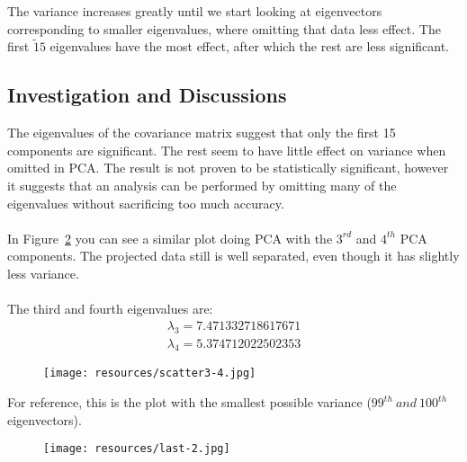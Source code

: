 \documentclass{article}
\begin{document}
\begin{multicols}{2}
    The variance increases greatly until we start looking at eigenvectors corresponding to
    smaller eigenvalues, where omitting that data less effect. The first $\tilde15$ eigenvalues
    have the most effect, after which the rest are less significant.

    \subsection{Investigation and Discussions}
    The eigenvalues of the covariance matrix suggest that only the first 15 components are significant.
    The rest seem to have little effect on variance when omitted in PCA. The result is not proven
    to be statistically significant, however it suggests that an analysis can be performed by omitting
    many of the eigenvalues without sacrificing too much accuracy.
    \\
    \\ 
    In Figure~\ref{fig:add} you can see a similar plot doing PCA with the $3^{rd}$ and $4^{th}$ PCA components.
    The projected data still is well separated, even though it has slightly less variance. 
    \\
    \\
    The third and fourth eigenvalues are:
    \begin{align*}
        \lambda_3 = 7.471332718617671 \\
        \lambda_4 = 5.374712022502353
    \end{align*}
    
    \begin{figure}[H]
        \texttt{[image: resources/scatter3-4.jpg]}
        \label{fig:add} 
    \end{figure}
    
    For reference, this is the plot with the smallest possible variance ($99^{th}\ and\ 100^{th}$ eigenvectors).
    
    \begin{figure}[H]
        \texttt{[image: resources/last-2.jpg]}
        \label{fig:add} 
    \end{figure}
    
    \end{multicols}
    
\end{document}
